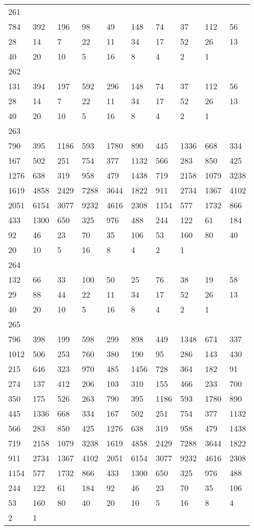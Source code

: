 \begin{longtable}{*{10}{l}}
261&&&&&&&&&\\
784& 392& 196& 98& 49& 148& 74& 37& 112& 56\\
28& 14& 7& 22& 11& 34& 17& 52& 26& 13\\
40& 20& 10& 5& 16& 8& 4& 2& 1& \\

262&&&&&&&&&\\
131& 394& 197& 592& 296& 148& 74& 37& 112& 56\\
28& 14& 7& 22& 11& 34& 17& 52& 26& 13\\
40& 20& 10& 5& 16& 8& 4& 2& 1& \\

263&&&&&&&&&\\
790& 395& 1186& 593& 1780& 890& 445& 1336& 668& 334\\
167& 502& 251& 754& 377& 1132& 566& 283& 850& 425\\
1276& 638& 319& 958& 479& 1438& 719& 2158& 1079& 3238\\
1619& 4858& 2429& 7288& 3644& 1822& 911& 2734& 1367& 4102\\
2051& 6154& 3077& 9232& 4616& 2308& 1154& 577& 1732& 866\\
433& 1300& 650& 325& 976& 488& 244& 122& 61& 184\\
92& 46& 23& 70& 35& 106& 53& 160& 80& 40\\
20& 10& 5& 16& 8& 4& 2& 1& \\

264&&&&&&&&&\\
132& 66& 33& 100& 50& 25& 76& 38& 19& 58\\
29& 88& 44& 22& 11& 34& 17& 52& 26& 13\\
40& 20& 10& 5& 16& 8& 4& 2& 1& \\

265&&&&&&&&&\\
796& 398& 199& 598& 299& 898& 449& 1348& 674& 337\\
1012& 506& 253& 760& 380& 190& 95& 286& 143& 430\\
215& 646& 323& 970& 485& 1456& 728& 364& 182& 91\\
274& 137& 412& 206& 103& 310& 155& 466& 233& 700\\
350& 175& 526& 263& 790& 395& 1186& 593& 1780& 890\\
445& 1336& 668& 334& 167& 502& 251& 754& 377& 1132\\
566& 283& 850& 425& 1276& 638& 319& 958& 479& 1438\\
719& 2158& 1079& 3238& 1619& 4858& 2429& 7288& 3644& 1822\\
911& 2734& 1367& 4102& 2051& 6154& 3077& 9232& 4616& 2308\\
1154& 577& 1732& 866& 433& 1300& 650& 325& 976& 488\\
244& 122& 61& 184& 92& 46& 23& 70& 35& 106\\
53& 160& 80& 40& 20& 10& 5& 16& 8& 4\\
2& 1& \\


\end{longtable}
